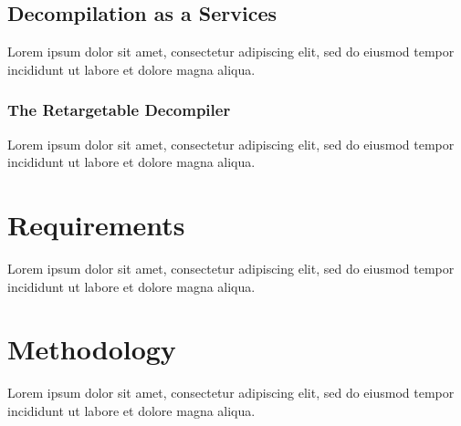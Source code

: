 \documentclass[12pt, a4paper]{article}
\begin{document}
\cite{hexrays}


\subsection{Decompilation as a Services}

Lorem ipsum dolor sit amet, consectetur adipiscing elit, sed do eiusmod tempor incididunt ut labore et dolore magna aliqua.


\subsubsection{The Retargetable Decompiler}

Lorem ipsum dolor sit amet, consectetur adipiscing elit, sed do eiusmod tempor incididunt ut labore et dolore magna aliqua.

\cite{retargetable_decomp}



\section{Requirements}

Lorem ipsum dolor sit amet, consectetur adipiscing elit, sed do eiusmod tempor incididunt ut labore et dolore magna aliqua.


\section{Methodology}

Lorem ipsum dolor sit amet, consectetur adipiscing elit, sed do eiusmod tempor incididunt ut labore et dolore magna aliqua.

\end{document}
